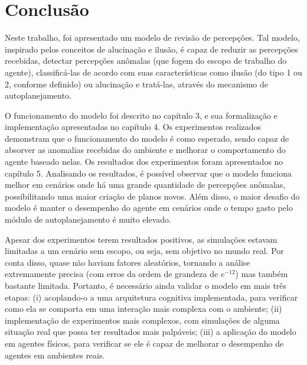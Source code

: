 \chapter{Conclusão}

Neste trabalho, foi apresentado um modelo de revisão de percepções. Tal modelo, inspirado pelos conceitos de alucinação e ilusão, é capaz de reduzir as percepções recebidas, detectar percepções anômalas (que fogem do escopo de trabalho do agente), classificá-las de acordo com suas características como ilusão (do tipo 1 ou 2, conforme definido) ou alucinação e tratá-las, através do mecanismo de autoplanejamento.

O funcionamento do modelo foi descrito no capítulo 3, e sua formalização e implementação apresentadas no capítulo 4. Os experimentos realizados demonstram que o funcionamento do modelo é como esperado, sendo capaz de absorver as anomalias recebidas do ambiente e melhorar o comportamento do agente baseado nelas. Os resultados dos experimentos foram apresentados no capítulo 5. 
Analisando os resultados, é possível observar que o modelo funciona melhor em cenários onde há uma grande quantidade de percepções anômalas, possibilitando uma maior criação de planos novos. Além disso, o maior desafio do modelo é manter o desempenho do agente em cenários onde o tempo gasto pelo módulo de autoplanejamento é muito elevado.

Apesar dos experimentos terem resultados positivos, as simulações estavam limitadas a um cenário sem escopo, ou seja, sem objetivo no mundo real. Por conta disso, quase não haviam fatores aleatórios, tornando a análise extremamente precisa (com erros da ordem de grandeza de $e^{-12}$) mas também bastante limitada.
Portanto, é necessário ainda validar o modelo em mais três etapas: (i) acoplando-o a uma arquitetura cognitiva implementada, para verificar como ela se comporta em uma interação mais complexa com o ambiente; (ii) implementação de experimentos mais complexos, com simulações de alguma situação real que possa ter resultados mais palpáveis; (iii) a aplicação do modelo em agentes físicos, para verificar se ele é capaz de melhorar o desempenho de agentes em ambientes reais.


